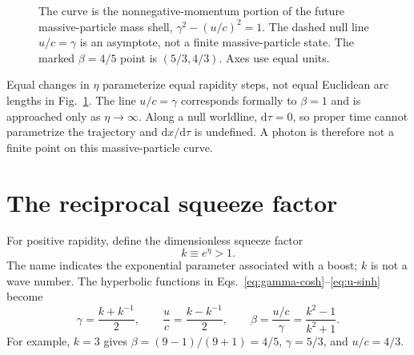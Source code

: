 \documentclass[12pt]{article}
\begin{document}
\begin{figure}[ht]
  \centering
  \caption{The curve is the nonnegative-momentum portion of the future massive-particle mass shell, $\gamma^2-(u/c)^2=1$. The dashed null line $u/c=\gamma$ is an asymptote, not a finite massive-particle state. The marked $\beta=4/5$ point is $(5/3,4/3)$. Axes use equal units.}
  \label{fig:mass-shell-hyperbola}
\end{figure}

Equal changes in $\eta$ parameterize equal rapidity steps, not equal Euclidean arc lengths in Fig.~\ref{fig:mass-shell-hyperbola}. The line $u/c=\gamma$ corresponds formally to $\beta=1$ and is approached only as $\eta\to\infty$. Along a null worldline, $\mathrm{d}\tau=0$, so proper time cannot parametrize the trajectory and $\mathrm{d}x/\mathrm{d}\tau$ is undefined. A photon is therefore not a finite point on this massive-particle curve.

\section{The reciprocal squeeze factor}
\label{sec:squeeze}

For positive rapidity, define the dimensionless squeeze factor
\begin{equation}
  k\equiv e^\eta>1.
  \label{eq:k-definition}
\end{equation}
The name indicates the exponential parameter associated with a boost; $k$ is not a wave number. The hyperbolic functions in Eqs.~\eqref{eq:gamma-cosh}--\eqref{eq:u-sinh} become
\begin{equation}
  \gamma=\frac{k+k^{-1}}{2},
  \qquad
  \frac{u}{c}=\frac{k-k^{-1}}{2},
  \qquad
  \beta=\frac{u/c}{\gamma}=\frac{k^2-1}{k^2+1}.
  \label{eq:k-kinematics}
\end{equation}
For example, $k=3$ gives $\beta=(9-1)/(9+1)=4/5$, $\gamma=5/3$, and $u/c=4/3$.
\end{document}
